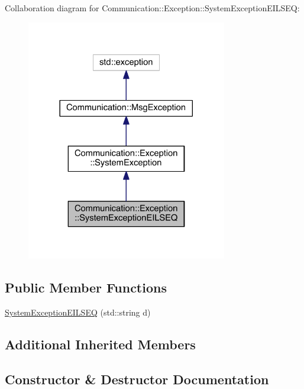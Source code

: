 Collaboration diagram for Communication\+:\+:Exception\+:\+:System\+Exception\+E\+I\+L\+S\+E\+Q\+:\nopagebreak
\begin{figure}[H]
\begin{center}
\leavevmode
\includegraphics[width=248pt]{class_communication_1_1_exception_1_1_system_exception_e_i_l_s_e_q__coll__graph}
\end{center}
\end{figure}
\subsection*{Public Member Functions}
\begin{DoxyCompactItemize}
\item 
\hyperlink{class_communication_1_1_exception_1_1_system_exception_e_i_l_s_e_q_af8ace6e341fc42bad5c9685d954e08d4}{System\+Exception\+E\+I\+L\+S\+E\+Q} (std\+::string d)
\end{DoxyCompactItemize}
\subsection*{Additional Inherited Members}


\subsection{Constructor \& Destructor Documentation}
\hypertarget{class_communication_1_1_exception_1_1_system_exception_e_i_l_s_e_q_af8ace6e341fc42bad5c9685d954e08d4}{}
